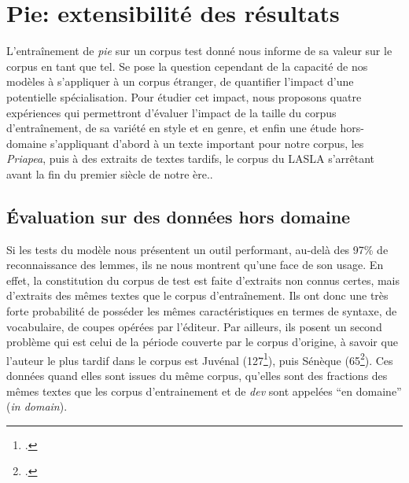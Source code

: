 \section{Pie: extensibilité des résultats}

L'entraînement de \textit{pie} sur un corpus test donné nous informe de sa valeur sur le corpus en tant que tel. Se pose la question cependant de la capacité de nos modèles à s'appliquer à un corpus étranger, de quantifier l'impact d'une potentielle spécialisation. Pour étudier cet impact, nous proposons quatre expériences qui permettront d'évaluer l'impact de la taille du corpus d'entraînement, de sa variété en style et en genre, et enfin une étude hors-domaine s'appliquant d'abord à un texte important pour notre corpus, les \textit{Priapea}, puis à des extraits de textes tardifs, le corpus du LASLA s'arrêtant avant la fin du premier siècle de notre ère..

\subsection{Évaluation sur des données hors domaine}
\label{subsec:lemmatisation:hors-domaine}

Si les tests du modèle nous présentent un outil performant, au-delà des 97\% de reconnaissance des lemmes, ils ne nous montrent qu'une face de son usage. En effet, la constitution du corpus de test est faite d'extraits non connus certes, mais d'extraits des mêmes textes que le corpus d'entraînement. Ils ont donc une très forte probabilité de posséder les mêmes caractéristiques en termes de syntaxe, de vocabulaire, de coupes opérées par l'éditeur. Par ailleurs, ils posent un second problème qui est celui de la période couverte par le corpus d'origine, à savoir que l'auteur le plus tardif dans le corpus est Juvénal (127\footcite[p. 320]{fredouille}), puis Sénèque (65\footcite[p. 231]{fredouille}). Ces données quand elles sont issues du même corpus, qu'elles sont des fractions des mêmes textes que les corpus d'entrainement et de \textit{dev} sont appelées \enquote{en domaine} (\textit{in domain}).

